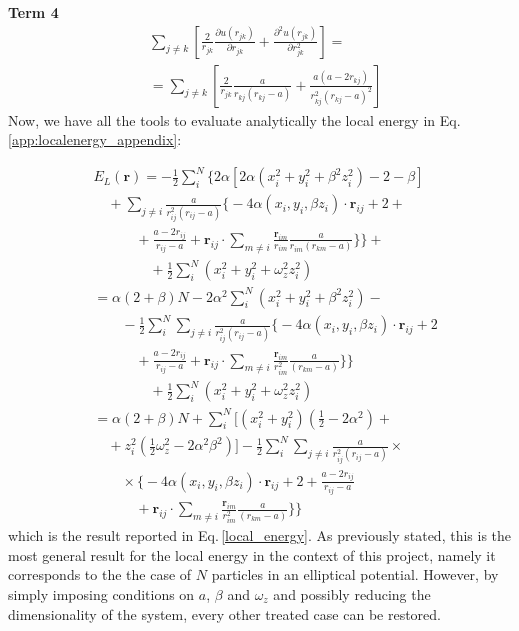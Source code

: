 \textbf{Term 4}
\begin{align*}
    &\sum_{j\neq k} \left[ \frac{2}{r_{jk}} \frac{\partial u(r_{jk})}{\partial r_{jk}} + \frac{\partial^2 u(r_{jk})}{\partial r_{jk}^2} \right] = \\
    &= \sum_{j\neq k} \left[ \frac{2}{r_{jk}} \frac{a}{r_{kj} \left( r_{kj} - a \right)} + \frac{a \left(a - 2 r_{kj} \right) }{r_{kj}^2 \left( r_{kj} - a \right)^2 } \right]
\end{align*}
Now, we have all the tools to evaluate analytically the local energy in Eq.\,\ref{app:localenergy_appendix}:

\begin{align*}
    &E_L(\mathbf{r})
    =-\frac{1}{2} \sum_i^N  \bigg\{ 2 \alpha \left[  2 \alpha (x_i^2 + y_i^2 + \beta^2 z_i^2 ) -2 -\beta \right] \\
    &\quad + \sum_{j\neq i} \frac{a}{r_{ij}^2 (r_{ij} - a)} \bigg\{ -4 \alpha \left( x_i, y_i, \beta z_i \right) \cdot \mathbf{r}_{ij} + 2 + \\ 
    & \quad \quad \quad + \frac{a - 2r_{ij}}{ r_{ij} - a } + \mathbf{r}_{ij} \cdot \sum_{m \neq i}   \frac{\mathbf{r}_{im}}{r_{im}} \frac{a}{r_{im} \left( r_{km} - a \right)} \bigg\} \bigg\} + \\
    & \quad\quad\quad\quad+ \frac{1}{2} 
    \sum_i^N (x_i^2 + y_i^2 + \omega_{z}^2 z_i^2) \\
    &= \alpha (2 + \beta) N -  2 \alpha^2 \sum_i^N (x_i^2 + y_i^2 + \beta^2 z_i^2 ) - \\
    &\quad \quad -\frac{1}{2} \sum_i^N \sum_{j\neq i} \frac{a}{r_{ij}^2 (r_{ij} - a)} \bigg\{ -4 \alpha \left( x_i, y_i, \beta z_i \right) \cdot \mathbf{r}_{ij} + 2 \\
    &\quad \quad \quad +\frac{a - 2r_{ij}}{ r_{ij} - a } + \mathbf{r}_{ij} \cdot \sum_{m \neq i}   \frac{\mathbf{r}_{im}}{r_{im}^2} \frac{a}{ \left( r_{km} - a \right)} \bigg\} \bigg\} \\
    &\quad \quad \quad \quad
    +\frac{1}{2} \sum_i^N (x_i^2 + y_i^2 + \omega_{z}^2 z_i^2) \\
    &= \alpha (2 + \beta) N + \sum_i^N \bigg[ (x_i^2 + y_i^2)\left(\frac{1}{2}- 2\alpha^2 \right) + \\
    & \quad + z_i^2\left( \frac{1}{2} \omega_z^2 - 2\alpha^2\beta^2 \right) \bigg] -  \frac{1}{2} \sum_i^N \sum_{j\neq i} \frac{a}{r_{ij}^2 (r_{ij} - a)} \times \\
    & \quad\quad \times \bigg\{ -4 \alpha \left( x_i, y_i, \beta z_i \right) \cdot \mathbf{r}_{ij} + 2 + \frac{a - 2r_{ij}}{r_{ij} - a } \\
    &\quad \quad \quad + \mathbf{r}_{ij} \cdot \sum_{m \neq i}   \frac{\mathbf{r}_{im}}{r_{im}^2} \frac{a}{\left( r_{km} - a \right)} \bigg\} \bigg\}
\end{align*}
which is the result reported in Eq.\,\ref{local_energy}. As previously stated, this is the most general result for the local energy in the context of this project, namely it corresponds to the the case of $N$ particles in an elliptical potential. However, by simply imposing conditions on $a$, $\beta$ and $\omega_z$ and possibly reducing the dimensionality of the system, every other treated case can be restored.